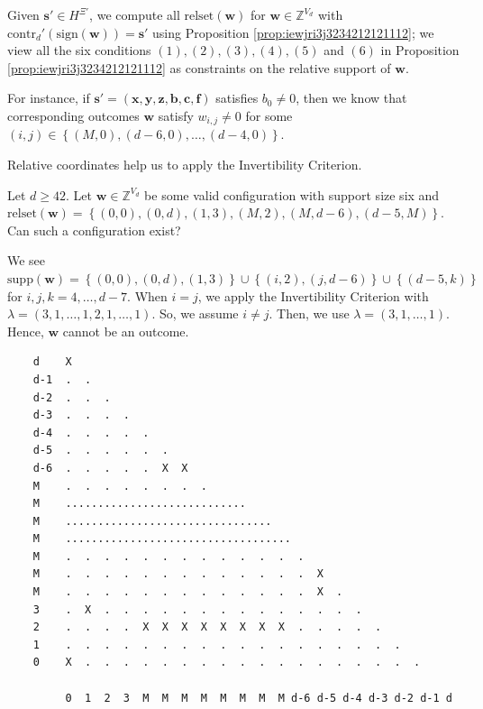\begin{remark}
    Given \( \mathbf{s}' \in {H}^{\Xi'} \), we compute all \( \mathrm{relset}(\mathbf{w}) \) for \( \mathbf{w} \in \mathbb{Z}^{V_d} \) with \( \mathrm{contr}_d'(\mathrm{sign}(\mathbf{w})) = \mathbf{s}'\) using Proposition \ref{prop:iewjri3j3234212121112}; we view all the six conditions \( (1), (2), (3), (4), (5) \) and \( (6) \) in Proposition \ref{prop:iewjri3j3234212121112} as constraints on the relative support of \( \mathbf{w} \). 
    
    For instance, if \( \mathbf{s}' = (\mathbf{x},\mathbf{y},\mathbf{z},\mathbf{b},\mathbf{c},\mathbf{f} ) \) satisfies \( b_0 \neq 0 \), then we know that corresponding outcomes \( \mathbf{w} \) satisfy \( w_{i,j} \neq 0 \) for some  \( (i,j) \in \left\{ (M,0), (d-6, 0), \dots, (d-4, 0) \right\} \).
\end{remark}

Relative coordinates help us to apply the Invertibility Criterion. 

\begin{example}\label{ex:siuh438h89}
    Let \( d \geq 42 \). Let \( \mathbf{w} \in \mathbb{Z}^{V_d} \) be some valid configuration with support size six and \( \mathrm{relset}(\mathbf{w}) = \left\{ (0,0), (0,d), (1,3), (M,2), (M, d-6), (d-5, M) \right\} \). Can such a configuration exist? 
    
    We see \( \mathrm{supp}(\mathbf{w}) = \left\{ (0,0), (0,d), (1,3) \right\} \cup \left\{ (i,2), (j,d-6 ) \right\} \cup \left\{ (d-5,k ) \right\} \)
    for \( i,j,k  = 4, \dots, d-7 \). When \( i = j \), we apply the Invertibility Criterion with \( \lambda = (3,1, \dots,1, 2, 1, \dots, 1) \). So, we assume \( i \neq j \). Then, we use \( \lambda = (3, 1, \dots, 1) \). Hence, \( \mathbf{w} \) cannot be an outcome.
\pagebreak
    \begin{small}
    \begin{verbatim}
    d    X
    d-1  .  .
    d-2  .  .  .
    d-3  .  .  .  .
    d-4  .  .  .  .  .
    d-5  .  .  .  .  .  .
    d-6  .  .  .  .  .  X  X
    M    .  .  .  .  .  .  .  .
    M    ............................
    M    ................................
    M    ...................................
    M    .  .  .  .  .  .  .  .  .  .  .  .  . 
    M    .  .  .  .  .  .  .  .  .  .  .  .  .  X
    M    .  .  .  .  .  .  .  .  .  .  .  .  .  X  .   
    3    .  X  .  .  .  .  .  .  .  .  .  .  .  .  .  .
    2    .  .  .  .  X  X  X  X  X  X  X  X  .  .  .  .  .     
    1    .  .  .  .  .  .  .  .  .  .  .  .  .  .  .  .  .  .
    0    X  .  .  .  .  .  .  .  .  .  .  .  .  .  .  .  .  .  .

         0  1  2  3  M  M  M  M  M  M  M  M d-6 d-5 d-4 d-3 d-2 d-1 d
    \end{verbatim}
    \end{small}
    
\end{example}

